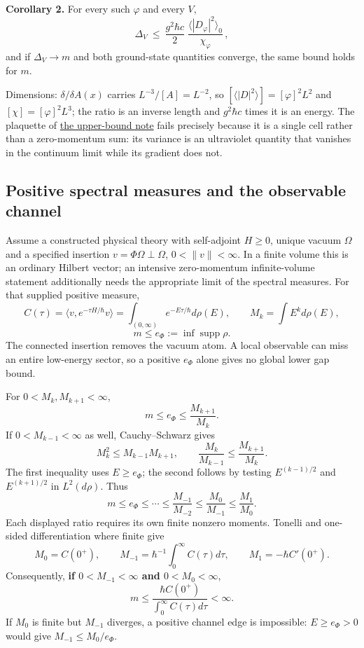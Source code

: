 \documentclass[11pt,a4paper]{article}
\begin{document}
\textbf{Corollary 2.} For every such \(\varphi\) and every \(V\),
\[\Delta_V\ \le\ \frac{g^2\hbar c}{2}\;\frac{\langle|D_\varphi|^2\rangle_0}{\chi_\varphi}\,,\]
and if \(\Delta_V\to m\) and both ground-state quantities converge, the
same bound holds for \(m\).

Dimensions: \(\delta/\delta A(x)\) carries \(L^{-3}/[A]=L^{-2}\), so
\([\langle|D|^2\rangle]=[\varphi]^2L^2\) and \([\chi]=[\varphi]^2L^3\);
the ratio is an inverse length and \(g^2\hbar c\) times it is an energy.
The plaquette of \href{lattice-gap-upper-bounds.md}{the upper-bound
note} fails precisely because it is a single cell rather than a
zero-momentum sum: its variance is an ultraviolet quantity that vanishes
in the continuum limit while its gradient does not.

\hypertarget{positive-spectral-measures-and-the-observable-channel}{%
\subsection{Positive spectral measures and the observable
channel}\label{positive-spectral-measures-and-the-observable-channel}}

Assume a constructed physical theory with self-adjoint \(H\ge0\), unique
vacuum \(\Omega\) and a specified insertion \(v=\Phi\Omega\perp\Omega\),
\(0<\|v\|<\infty\). In a finite volume this is an ordinary Hilbert
vector; an intensive zero-momentum infinite-volume statement
additionally needs the appropriate limit of the spectral measures. For
that supplied positive measure,
\[C(\tau)=\langle v,e^{-\tau H/\hbar}v\rangle
 =\int_{(0,\infty)}e^{-E\tau/\hbar}d\rho(E),\qquad
 M_k=\int E^k d\rho(E),\] \[m\le e_\Phi:=\inf\operatorname{supp}\rho.\]
The connected insertion removes the vacuum atom. A local observable can
miss an entire low-energy sector, so a positive \(e_\Phi\) alone gives
no global lower gap bound.

For \(0<M_k,M_{k+1}<\infty\), \[m\le e_\Phi\le\frac{M_{k+1}}{M_k}.\] If
\(0<M_{k-1}<\infty\) as well, Cauchy--Schwarz gives
\[M_k^2\le M_{k-1}M_{k+1},\qquad
 \frac{M_k}{M_{k-1}}\le\frac{M_{k+1}}{M_k}.\] The first inequality uses
\(E\ge e_\Phi\); the second follows by testing \(E^{(k-1)/2}\) and
\(E^{(k+1)/2}\) in \(L^2(d\rho)\). Thus
\[m\le e_\Phi\le\cdots\le\frac{M_{-1}}{M_{-2}}
 \le\frac{M_0}{M_{-1}}\le\frac{M_1}{M_0}.\] Each displayed ratio
requires its own finite nonzero moments. Tonelli and one-sided
differentiation where finite give
\[M_0=C(0^+),\qquad M_{-1}=\hbar^{-1}\int_0^\infty C(\tau)d\tau,
 \qquad M_1=-\hbar C'(0^+).\] Consequently, \textbf{if
\(0<M_{-1}<\infty\) and \(0<M_0<\infty\)},
\[m\le\frac{\hbar C(0^+)}{\int_0^\infty C(\tau)d\tau}<\infty.\] If
\(M_0\) is finite but \(M_{-1}\) diverges, a positive channel edge is
impossible: \(E\ge e_\Phi>0\) would give \(M_{-1}\le M_0/e_\Phi\).
\end{document}
